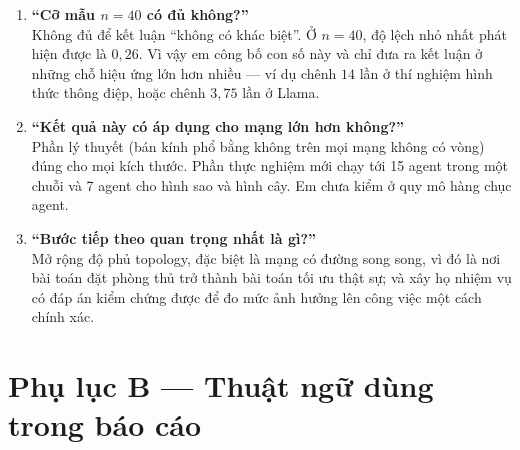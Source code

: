 \documentclass[11pt,a4paper]{article}
\begin{document}
\begin{enumerate}
  \item \textbf{``Cỡ mẫu $n = 40$ có đủ không?''}\\
  Không đủ để kết luận ``không có khác biệt''. Ở $n = 40$, độ lệch nhỏ nhất phát hiện
  được là $0{,}26$. Vì vậy em công bố con số này và chỉ đưa ra kết luận ở những chỗ
  hiệu ứng lớn hơn nhiều --- ví dụ chênh $14$ lần ở thí nghiệm hình thức thông điệp,
  hoặc chênh $3{,}75$ lần ở Llama.

  \item \textbf{``Kết quả này có áp dụng cho mạng lớn hơn không?''}\\
  Phần lý thuyết (bán kính phổ bằng không trên mọi mạng không có vòng) đúng cho mọi
  kích thước. Phần thực nghiệm mới chạy tới 15 agent trong một chuỗi và 7 agent cho
  hình sao và hình cây. Em chưa kiểm ở quy mô hàng chục agent.

  \item \textbf{``Bước tiếp theo quan trọng nhất là gì?''}\\
  Mở rộng độ phủ topology, đặc biệt là mạng có đường song song, vì đó là nơi bài toán
  đặt phòng thủ trở thành bài toán tối ưu thật sự; và xây họ nhiệm vụ có đáp án kiểm
  chứng được để đo mức ảnh hưởng lên công việc một cách chính xác.
\end{enumerate}

\section*{Phụ lục B --- Thuật ngữ dùng trong báo cáo}
\end{document}
